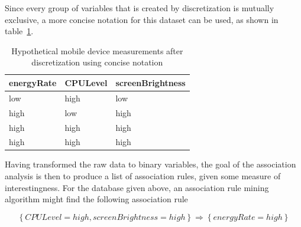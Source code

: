 Since every group of variables that is created by discretization is mutually exclusive, a more concise notation for this dataset can be used, as shown in table~\ref{table:discreteDataConcise}.

\begin{table}[htb]
    \begin{tabular}{ | l | l | l |}
    \hline
	\textbf{energyRate} & \textbf{CPULevel} & \textbf{screenBrightness} \\ \hline
    low & high & low  \\ \hline 
    high & low & high \\ \hline 
    high & high & high \\ \hline 
    high & high & high \\ \hline 
    \end{tabular}
    \caption{Hypothetical mobile device measurements after discretization using concise notation}
    \label{table:discreteDataConcise}
\end{table} 

 
 

Having transformed the raw data to binary variables, the goal of the association analysis is then to produce a list of association rules, given some measure of interestingness. For the database given above, an association rule mining algorithm might find the following association rule 

\[
	\left\{ CPULevel=high, screenBrightness=high \right\} \Rightarrow \left\{ energyRate=high \right\}
\]

